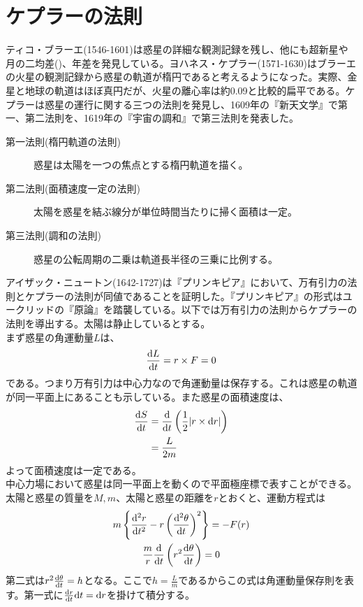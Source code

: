 \section{ケプラーの法則}
	ティコ・ブラーエ(1546-1601)は惑星の詳細な観測記録を残し、他にも超新星や月の二均差()、年差を発見している。ヨハネス・ケプラー(1571-1630)はブラーエの火星の観測記録から惑星の軌道が楕円であると考えるようになった。実際、金星と地球の軌道はほぼ真円だが、火星の離心率は約0.09と比較的扁平である。ケプラーは惑星の運行に関する三つの法則を発見し、1609年の『新天文学』で第一、第二法則を、1619年の『宇宙の調和』で第三法則を発表した。
	\begin{description}
		\item[第一法則(楕円軌道の法則)] 惑星は太陽を一つの焦点とする楕円軌道を描く。
		\item[第二法則(面積速度一定の法則)] 太陽を惑星を結ぶ線分が単位時間当たりに掃く面積は一定。
		\item[第三法則(調和の法則)] 惑星の公転周期の二乗は軌道長半径の三乗に比例する。
	\end{description}
	アイザック・ニュートン(1642-1727)は『プリンキピア』において、万有引力の法則とケプラーの法則が同値であることを証明した。『プリンキピア』の形式はユークリッドの『原論』を踏襲している。以下では万有引力の法則からケプラーの法則を導出する。太陽は静止しているとする。\\
	まず惑星の角運動量$L$は、
		\[\de[L]{t} = r \times F = 0\]
	である。つまり万有引力は中心力なので角運動量は保存する。これは惑星の軌道が同一平面上にあることも示している。また惑星の面積速度は、
	\begin{align*}
		\de[S]{t} &= \de{t} \lr{ \frac{1}{2}|r \times \d r| }\\
		          &= \frac{L}{2m}
	\end{align*}
	よって面積速度は一定である。\\
	中心力場において惑星は同一平面上を動くので平面極座標で表すことができる。太陽と惑星の質量を$M, m$、太陽と惑星の距離を$r$とおくと、運動方程式は
	\begin{gather*}
		m \mlr{ \de[^2r]{t^2} - r\lr{ \de[^2\theta]{t} }^2 } = - F(r)\\
		\frac{m}{r} \de{t} \lr{ r^2\de[\theta]{t} } = 0\\
	\end{gather*}
	第二式は$r^2\de[\theta]{t} = h$となる。ここで$h = \frac{L}{m}$であるからこの式は角運動量保存則を表す。第一式に$\de[r]{t}\d t = \d r$を掛けて積分する。
